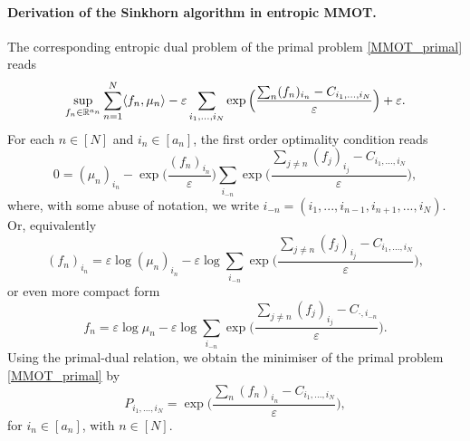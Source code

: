 \paragraph{Derivation of the Sinkhorn algorithm in entropic MMOT.} The corresponding entropic dual problem of the primal problem
\eqref{MMOT_primal} reads
\begin{equation}
  \sup_{f_n \in \mathbb R^{a_n}} \sum_{n=1}^N \langle f_n, \mu_n \rangle -
  \varepsilon \sum_{i_1,...,i_N} \exp\Big( \frac{\sum_n (f_n)_{i_n} - C_{i_1,...,i_N}}{\varepsilon} \Big) + \varepsilon.
\end{equation}
For each $n \in [N]$ and $i_n \in [a_n]$, the first order optimality condition reads
\begin{equation}
  0 = (\mu_n)_{i_n} - \exp\big( \frac{(f_n)_{i_n}}{\varepsilon} \big)
  \sum_{i_{-n}} \exp\Big( \frac{\sum_{j \neq n} (f_j)_{i_j} - C_{i_1,...,i_N}}{\varepsilon} \Big),
\end{equation}
where, with some abuse of notation, we write $i_{-n} = (i_1, ..., i_{n-1}, i_{n+1}, ..., i_N)$. Or, equivalently
\begin{equation}
  (f_n)_{i_n} = \varepsilon \log (\mu_n)_{i_n} - \varepsilon \log \sum_{i_{-n}}
  \exp\Big( \frac{\sum_{j \neq n} (f_j)_{i_j} - C_{i_1,...,i_N}}{\varepsilon} \Big),
\end{equation}
or even more compact form
\begin{equation}
  f_n = \varepsilon \log \mu_n - \varepsilon \log \sum_{i_{-n}}
  \exp\Big( \frac{\sum_{j \neq n} (f_j)_{i_j} - C_{\cdot, i_{-n}}}{\varepsilon} \Big).
\end{equation}
Using the primal-dual relation, we obtain the minimiser of the primal problem \eqref{MMOT_primal} by
\begin{equation}
  P_{i_1,...,i_N} = \exp\Big( \frac{\sum_n (f_n)_{i_n} - C_{i_1,...,i_N}}{\varepsilon} \Big),
\end{equation}
for $i_n \in [a_n]$, with $n \in [N]$.

